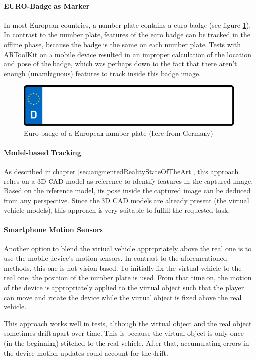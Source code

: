 \paragraph{EURO-Badge as Marker}
In most European countries, a number plate contains a euro badge (see figure \ref{fig:euroBadge}). In contrast to the number plate, features of the euro badge can be tracked in the offline phase, because the badge is the same on each number plate.
Tests with ARToolKit on a mobile device resulted in an improper calculation of the location and pose of the badge, which was perhaps down to the fact that there aren't enough (unambiguous) features to track inside this badge image.

\begin{figure}[btph]
  \centering
        \includegraphics[width=.25\linewidth]{gfx/marker_full}
        \caption{Euro badge of a European number plate (here from Germany)}
        \label{fig:euroBadge}
\end{figure}

\paragraph{Model-based Tracking}
As described in chapter \ref{sec:augmentedRealityStateOfTheArt}, this approach relies on a 3D CAD model as reference to identify features in the captured image. Based on the reference model, its pose inside the captured image can be deduced from any perspective. Since the 3D CAD models are already present (the virtual vehicle models), this approach is very suitable to fulfill the requested task.

\paragraph{Smartphone Motion Sensors}
Another option to blend the virtual vehicle appropriately above the real one is to use the mobile device's motion sensors. In contrast to the aforementioned methods, this one is not vision-based. To initially fix the virtual vehicle to the real one, the position of the number plate is used. From that time on, the motion of the device is appropriately applied to the virtual object such that the player can move and rotate the device while the virtual object is fixed above the real vehicle.

This approach works well in tests, although the virtual object and the real object sometimes drift apart over time. This is because the virtual object is only once (in the beginning) stitched to the real vehicle. After that, accumulating errors in the device motion updates could account for the drift.

